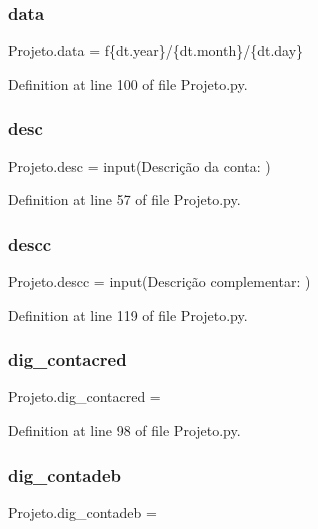 \subsubsection{data}
{\footnotesize\ttfamily Projeto.\+data = f\textquotesingle{}\{dt.\+year\}/\{dt.\+month\}/\{dt.\+day\}\textquotesingle{}}



Definition at line 100 of file Projeto.\+py.

\mbox{\label{namespace_projeto_a4196823affeae767dceac4b7fcfa7102}} 
\subsubsection{desc}
{\footnotesize\ttfamily Projeto.\+desc = input(\textquotesingle{}Descrição da conta\+: \textquotesingle{})}



Definition at line 57 of file Projeto.\+py.

\mbox{\label{namespace_projeto_a89d944e01203541f8d44f157e8747098}} 
\subsubsection{descc}
{\footnotesize\ttfamily Projeto.\+descc = input(\textquotesingle{}Descrição complementar\+: \textquotesingle{})}



Definition at line 119 of file Projeto.\+py.

\mbox{\label{namespace_projeto_abedb0558d49965245553b18218ac2966}} 
\subsubsection{dig\_contacred}
{\footnotesize\ttfamily Projeto.\+dig\+\_\+contacred = \textquotesingle{}\textquotesingle{}}



Definition at line 98 of file Projeto.\+py.

\mbox{\label{namespace_projeto_a2abe88aeabb7463f6be64bd544d7cc38}} 
\subsubsection{dig\_contadeb}
{\footnotesize\ttfamily Projeto.\+dig\+\_\+contadeb = \textquotesingle{}\textquotesingle{}}



